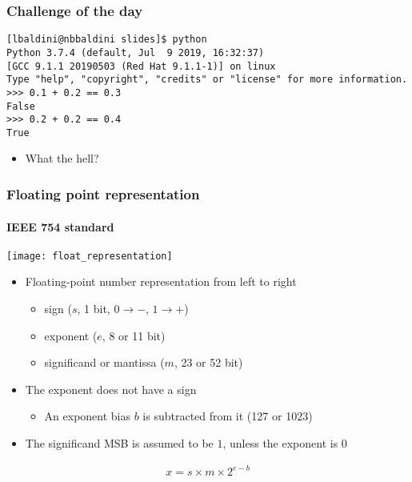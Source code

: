 \documentclass[9pt]{beamer}
\begin{document}
\begin{frame}[fragile]
  \frametitle{Challenge of the day}
  \begin{Verbatim}
[lbaldini@nbbaldini slides]$ python
Python 3.7.4 (default, Jul  9 2019, 16:32:37)
[GCC 9.1.1 20190503 (Red Hat 9.1.1-1)] on linux
Type "help", "copyright", "credits" or "license" for more information.
>>> 0.1 + 0.2 == 0.3
False
>>> 0.2 + 0.2 == 0.4
True
  \end{Verbatim}

  \bigskip

  \begin{itemize}
  \item \alert{What the hell?}
  \end{itemize}
\end{frame}


\begin{frame}
  \frametitle{Floating point representation}
  \framesubtitle{IEEE 754 standard}
  \centering\texttt{[image: float\_representation]}

  \bigskip

  \begin{itemize}
  \item Floating-point number representation from left to right
    \begin{itemize}
    \item \alert{sign} ($s$, 1 bit, $0 \rightarrow -$, $1 \rightarrow +$)
    \item \alert{exponent} ($e$, 8 or 11 bit)
    \item \alert{significand} or \alert{mantissa} ($m$, 23 or 52 bit)
    \end{itemize}
  \item The exponent does not have a sign
    \begin{itemize}
    \item An exponent bias $b$ is subtracted from it (127 or 1023)
    \end{itemize}
  \item The significand MSB is assumed to be $1$, unless the exponent is 0
  \end{itemize}

  \begin{align}
    x = s \times m \times 2^{e - b}
  \end{align}
\end{frame}
\end{document}
